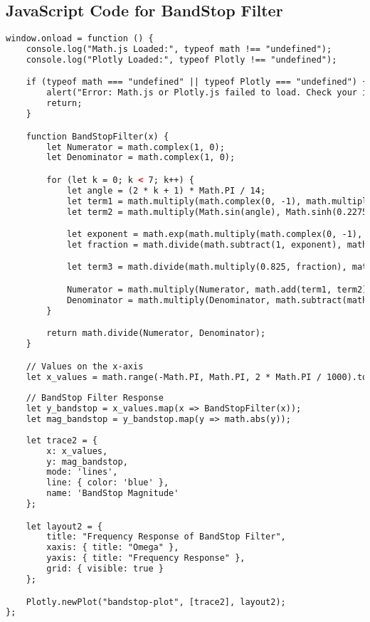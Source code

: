 \documentclass{article}
\begin{document}
\subsection{JavaScript Code for BandStop Filter}
\begin{lstlisting}[language=HTML, caption=Filter Type Definition]
window.onload = function () {
    console.log("Math.js Loaded:", typeof math !== "undefined");
    console.log("Plotly Loaded:", typeof Plotly !== "undefined");

    if (typeof math === "undefined" || typeof Plotly === "undefined") {
        alert("Error: Math.js or Plotly.js failed to load. Check your internet connection.");
        return;
    }

    function BandStopFilter(x) {
        let Numerator = math.complex(1, 0);
        let Denominator = math.complex(1, 0);

        for (let k = 0; k < 7; k++) {
            let angle = (2 * k + 1) * Math.PI / 14;
            let term1 = math.multiply(math.complex(0, -1), math.multiply(Math.cos(angle), Math.cosh(0.227540122101)));
            let term2 = math.multiply(Math.sin(angle), Math.sinh(0.227540122101));

            let exponent = math.exp(math.multiply(math.complex(0, -1), x));
            let fraction = math.divide(math.subtract(1, exponent), math.add(1, exponent));

            let term3 = math.divide(math.multiply(0.825, fraction), math.add(math.pow(fraction, 2), 0.94815));

            Numerator = math.multiply(Numerator, math.add(term1, term2));
            Denominator = math.multiply(Denominator, math.subtract(math.add(term3, term2), term1));
        }

        return math.divide(Numerator, Denominator);
    }

    // Values on the x-axis
    let x_values = math.range(-Math.PI, Math.PI, 2 * Math.PI / 1000).toArray();
        
    // BandStop Filter Response
    let y_bandstop = x_values.map(x => BandStopFilter(x));
    let mag_bandstop = y_bandstop.map(y => math.abs(y));
    
    let trace2 = {
        x: x_values,
        y: mag_bandstop,
        mode: 'lines',
        line: { color: 'blue' },
        name: 'BandStop Magnitude'
    };

    let layout2 = {
        title: "Frequency Response of BandStop Filter",
        xaxis: { title: "Omega" },
        yaxis: { title: "Frequency Response" },
        grid: { visible: true }
    };

    Plotly.newPlot("bandstop-plot", [trace2], layout2);
};
\end{lstlisting}
\end{document}
